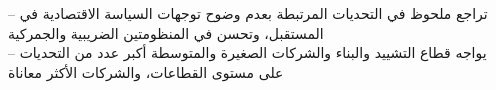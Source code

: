 -- تراجع ملحوظ في التحديات المرتبطة بعدم وضوح توجهات السياسة الاقتصادية في المستقبل، وتحسن في المنظومتين الضريبية والجمركية\\
-- يواجه قطاع التشييد والبناء والشركات الصغيرة والمتوسطة أكبر عدد من التحديات على مستوى القطاعات، والشركات الأكثر معاناة
